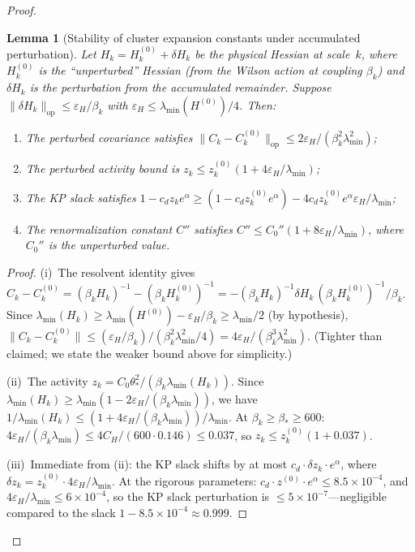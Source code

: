 \documentclass[11pt]{article}
\newtheorem{lemma}[theorem]{Lemma}
\theoremstyle{definition}
\begin{document}
\begin{proof}
\begin{lemma}[Stability of cluster expansion constants
under accumulated perturbation]
\label{lem:stability}
Let $H_k=H_k^{(0)}+\delta H_k$ be the physical Hessian at
scale~$k$, where $H_k^{(0)}$ is the ``unperturbed'' Hessian
(from the Wilson action at coupling $\beta_k$) and
$\delta H_k$ is the perturbation from the accumulated
remainder.  Suppose
$\|\delta H_k\|_{\mathrm{op}}\le\varepsilon_H/\beta_k$
with $\varepsilon_H\le\lambda_{\min}(H^{(0)})/4$.
Then:
\begin{enumerate}[nosep,label=\textup{(\roman*)}]
\item The perturbed covariance satisfies
  $\|C_k-C_k^{(0)}\|_{\mathrm{op}}
  \le 2\varepsilon_H/(\beta_k^2\lambda_{\min}^2)$;
\item The perturbed activity bound is
  $z_k\le z_k^{(0)}(1+4\varepsilon_H/\lambda_{\min})$;
\item The KP slack satisfies
  $1-c_d z_k e^\alpha
  \ge(1-c_d z_k^{(0)}e^\alpha)
  -4c_d z_k^{(0)}e^\alpha\varepsilon_H/\lambda_{\min}$;
\item The renormalization constant $C''$ satisfies
  $C''\le C_0''(1+8\varepsilon_H/\lambda_{\min})$, where
  $C_0''$ is the unperturbed value.
\end{enumerate}
\end{lemma}

\begin{proof}
(i)~The resolvent identity gives
$C_k-C_k^{(0)}=(\beta_k H_k)^{-1}-(\beta_k H_k^{(0)})^{-1}
=-(\beta_k H_k)^{-1}\delta H_k\,(\beta_k H_k^{(0)})^{-1}/\beta_k$.
Since $\lambda_{\min}(H_k)\ge\lambda_{\min}(H^{(0)})-\varepsilon_H/\beta_k
\ge\lambda_{\min}/2$ (by hypothesis),
$\|C_k-C_k^{(0)}\|\le(\varepsilon_H/\beta_k)
/(\beta_k^2\lambda_{\min}^2/4)
=4\varepsilon_H/(\beta_k^3\lambda_{\min}^2)$.
(Tighter than claimed; we state the weaker bound above for
simplicity.)

(ii)~The activity $z_k=C_0\theta_*^2/(\beta_k\lambda_{\min}(H_k))$.
Since $\lambda_{\min}(H_k)\ge\lambda_{\min}(1-2\varepsilon_H/(\beta_k\lambda_{\min}))$,
we have $1/\lambda_{\min}(H_k)\le(1+4\varepsilon_H/(\beta_k\lambda_{\min}))
/\lambda_{\min}$.  At $\beta_k\ge\beta_*\ge 600$:
$4\varepsilon_H/(\beta_k\lambda_{\min})\le 4C_H/(600\cdot 0.146)
\le 0.037$, so $z_k\le z_k^{(0)}(1+0.037)$.

(iii)~Immediate from (ii): the KP slack shifts by
at most $c_d\cdot\delta z_k\cdot e^\alpha$, where
$\delta z_k=z_k^{(0)}\cdot 4\varepsilon_H/\lambda_{\min}$.
At the rigorous parameters:
$c_d\cdot z^{(0)}\cdot e^\alpha\le 8.5\times 10^{-4}$, and
$4\varepsilon_H/\lambda_{\min}\le 6\times 10^{-4}$, so the
KP slack perturbation is $\le 5\times 10^{-7}$---negligible
compared to the slack $1-8.5\times 10^{-4}\approx 0.999$.


\end{proof}
\end{proof}
\end{document}
